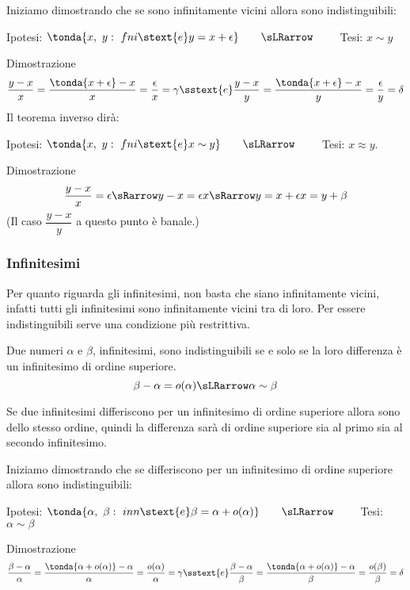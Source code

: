 Iniziamo dimostrando che se sono infinitamente vicini allora sono 
indistinguibili:
\begin{center}
Ipotesi: \(\tonda{x,~y:\ fni \stext{e} y = x+\epsilon} \qquad \sLRarrow 
\qquad\) 
Tesi: \(x \sim y\)
\end{center}
Dimostrazione
\[\frac{y-x}{x}=\frac{\tonda{x+\epsilon}-x}{x} = 
\frac{\epsilon}{x}= \gamma \sstext{e} 
\frac{y-x}{y}=\frac{\tonda{x+\epsilon}-x}{y} = 
\frac{\epsilon}{y}= \delta
\]
Il teorema inverso dirà:
\begin{center}
Ipotesi: \(\tonda{x,~y:\ fni \stext{e} x \sim y} \qquad \sLRarrow \qquad\) 
Tesi: \(x \approx y\).
\end{center}
Dimostrazione
\[\frac{y-x}{x} = \epsilon
\sRarrow y-x = \epsilon x \sRarrow y = x+\epsilon x = y+\beta
\]
(Il caso $\dfrac{y-x}{y}$ a questo punto è banale.)

\subsubsection{Infinitesimi}
\label{subsubsec:insnum_infinitesimi}

Per quanto riguarda gli infinitesimi, non basta che siano infinitamente 
vicini, infatti tutti gli infinitesimi sono infinitamente vicini tra di 
loro.
Per essere indistinguibili serve una condizione più restrittiva.

\begin{teorema}
Due numeri \(\alpha\) e \(\beta\), infinitesimi, 
sono indistinguibili se e solo se la loro differenza è un infinitesimo di 
ordine superiore.
\[\beta-\alpha = o(\alpha) \sLRarrow \alpha \sim \beta\] 
\end{teorema}

\begin{osservazione}
Se due infinitesimi differiscono per un infinitesimo di ordine superiore 
allora sono dello stesso ordine, quindi la differenza sarà di ordine 
superiore sia al primo sia al secondo infinitesimo.
\end{osservazione}

Iniziamo dimostrando che se differiscono per un infinitesimo di ordine 
superiore allora sono indistinguibili:
\begin{center}
Ipotesi: \(\tonda{\alpha,~\beta:\ inn \stext{e} \beta = \alpha +o(\alpha)}
\qquad \sLRarrow\qquad\) 
Tesi: \(\alpha \sim \beta\)
\end{center}
Dimostrazione
\[\frac{\beta-\alpha}{\alpha}=
\frac{\tonda{\alpha +o(\alpha)}-\alpha}{\alpha} = 
\frac{o(\alpha)}{\alpha}= \gamma \sstext{e} 
\frac{\beta-\alpha}{\beta}=
\frac{\tonda{\alpha +o(\alpha)}-\alpha}{\beta} = 
\frac{o(\beta)}{\beta}= \delta
\]

